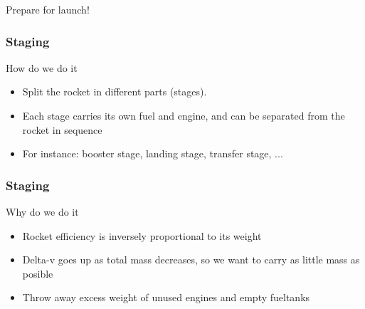 {
\begin{frame}
    \begin{block}{}
        \begin{center}
            Prepare for launch!
        \end{center}
    \end{block}
\end{frame}
%
\begin{frame}
\end{frame}
\begin{frame}
    \frametitle{Staging}
    \begin{block}{How do we do it}
        \begin{itemize}
            \item Split the rocket in different parts (stages).
            \item Each stage carries its own fuel and engine, and can be separated from the rocket in sequence
            \item For instance: booster stage, landing stage, transfer stage, ...
        \end{itemize}
    \end{block}
\end{frame}
\begin{frame}
    \frametitle{Staging}
    \begin{block}{Why do we do it}
        \begin{itemize}
            \item Rocket efficiency is inversely proportional to its weight
            \item Delta-v goes up as total mass decreases, so we want to carry as little mass as posible
            \item Throw away excess weight of unused engines and empty fueltanks
        \end{itemize}
    \end{block}
\end{frame}
}
